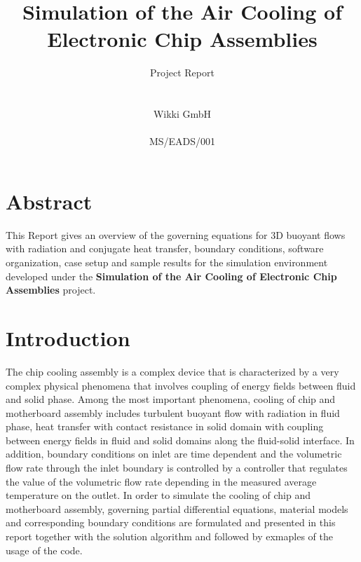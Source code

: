 

%
\renewcommand{\ReportType}{Project Report}
\renewcommand{\ReportNo}{MS/EADS/001}

%

%
%
\title
{
  \bfseries Simulation of the Air Cooling of Electronic Chip Assemblies 
}
%
\author
{
     \ReportType\\ \\ \\
     Wikki GmbH\\ \\
     \ReportNo
}
%
\maketitle
%
\section*{Abstract}
  This Report gives an overview of the governing equations for 3D
  buoyant flows with radiation and conjugate heat transfer, boundary
  conditions, software organization, case setup and sample results for
  the simulation environment developed under the {\bfseries Simulation
    of the Air Cooling of Electronic Chip Assemblies} project.

%
\section*{Introduction}

The chip cooling assembly is a complex device that is characterized by
a very complex physical phenomena that involves coupling of energy
fields between fluid and solid phase. Among the most important
phenomena, cooling of chip and motherboard assembly includes turbulent
buoyant flow with radiation in fluid phase, heat transfer with contact
resistance in solid domain with coupling between energy fields in
fluid and solid domains along the fluid-solid interface. In addition,
boundary conditions on inlet are time dependent and the volumetric
flow rate through the inlet boundary is controlled by a controller
that regulates the value of the volumetric flow rate depending in the
measured average temperature on the outlet. In order to simulate the
cooling of chip and motherboard assembly, governing partial
differential equations, material models and corresponding boundary
conditions are formulated and presented in this report together with
the solution algorithm and followed by exmaples of the usage of the
code.

